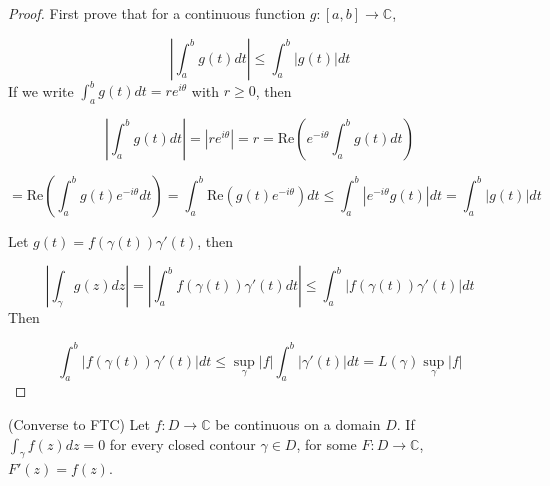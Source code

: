 \begin{proof}
	First prove that for a continuous function $g: [a, b] \rightarrow \mathbb{C}$,

	\[ \left | \int_a^b g(t) dt \right | \le \int_a^b |g(t)| dt \]
	If we write $\int_a^b g(t) dt = r e^{i \theta}$ with $r \ge 0$, then

	\[ \left | \int_a^b g(t) dt \right | = |r e^{i \theta}| = r = \text{Re} \left( e^{-i \theta} \int_a^b g(t) dt \right ) \]

	\[ = \text{Re}\left( \int_a^b g(t) e^{-i \theta} dt \right) = \int_a^b \text{Re}( g(t) e^{-i \theta}) dt \le \int_a^b \left |e^{-i \theta} g(t) \right | dt = \int_a^b |g(t)| dt \]

	Let $g(t) = f(\gamma(t)) \gamma'(t)$, then

	\[ \left | \int_{\gamma} g(z) dz \right | = \left | \int_a^b f(\gamma(t)) \gamma'(t) dt \right | \le \int_a^b \left | f(\gamma(t)) \gamma'(t) \right | dt \]
	Then

	\[ \int_a^b \left | f(\gamma(t)) \gamma'(t) \right | dt \le \sup_{\gamma} |f| \int_a^b |\gamma'(t)| dt = L(\gamma) \sup_{\gamma} |f| \]
\end{proof}

\begin{theorem}
	(Converse to FTC) Let $f: D \rightarrow \mathbb{C}$ be continuous on a domain $D$. If $\int_{\gamma} f(z) dz = 0$ for every closed contour $\gamma \in D$, for some $F: D \rightarrow \mathbb{C}$, $F'(z) = f(z)$.
\end{theorem}

